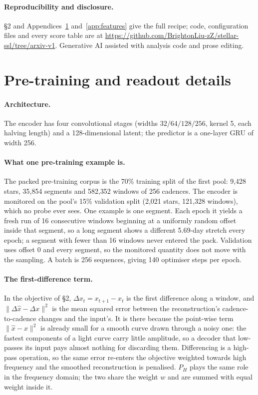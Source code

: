 \documentclass{article}
\begin{document}
\paragraph{Reproducibility and disclosure.} \S2 and Appendices~\ref{app:training}
and~\ref{app:features} give the full recipe; code, configuration files and every score table are at
\url{https://github.com/BrightonLiu-zZ/stellar-ssl/tree/arxiv-v1}. Generative AI assisted with
analysis code and prose editing.

\raggedbottom



\appendix

\section{Pre-training and readout details}
\label{app:training}

\paragraph{Architecture.} The encoder has four convolutional stages (widths $32/64/128/256$, kernel 5,
each halving length) and a 128-dimensional latent; the predictor is a one-layer GRU of width 256.

\paragraph{What one pre-training example is.} The packed pre-training corpus is the 70\% training
split of the first pool: 9{,}428 stars, 35{,}854 segments and 582{,}352 windows of 256 cadences. The
encoder is monitored on the pool's 15\% validation split (2{,}021 stars, 121{,}328 windows), which no
probe ever sees. One example is one segment. Each epoch it yields a fresh run of 16 consecutive
windows beginning at a uniformly random offset inside that segment, so a long segment shows a
different 5.69-day stretch every epoch; a segment with fewer than 16 windows never entered the pack.
Validation uses offset 0 and every segment, so the monitored quantity does not move with the
sampling. A batch is 256 sequences, giving 140 optimiser steps per epoch.

\paragraph{The first-difference term.} In the objective of \S2, $\Delta x_{t} = x_{t+1} - x_{t}$ is
the first difference along a window, and $\|\Delta\hat{x}-\Delta x\|^{2}$ is the mean squared error
between the reconstruction's cadence-to-cadence changes and the input's. It is there because the
point-wise term $\|\hat{x}-x\|^{2}$ is already small for a smooth curve drawn through a noisy one:
the fastest components of a light curve carry little amplitude, so a decoder that low-passes its
input pays almost nothing for discarding them. Differencing is a high-pass operation, so the same
error re-enters the objective weighted towards high frequency and the smoothed reconstruction is
penalised. $P_{H}$ plays the same role in the frequency domain; the two share the weight $w$ and are
summed with equal weight inside it.
\end{document}

